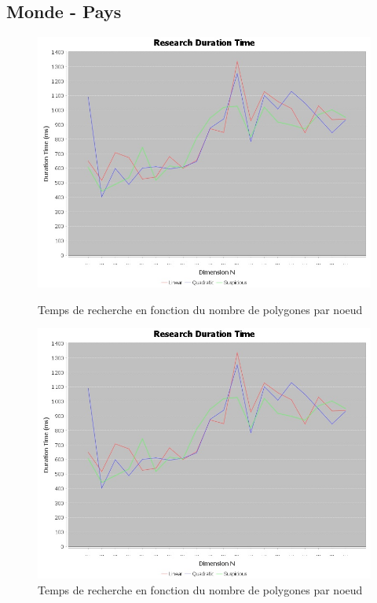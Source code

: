 \documentclass {article}
\begin{document}

\subsection {Monde - Pays}\label{mondePays}

\begin{figure}[h]
    \begin{minipage}[t]{0.46\textwidth}
	\centering
	\includegraphics[width=\textwidth]{research_graph_belgium.png}
	\caption{Temps de recherche en fonction du nombre de polygones par noeud}
	\label{fig:belgique_stat_find_lin}
    \end{minipage}
    \begin{minipage}[t]{0.46\textwidth}
	\centering
	\includegraphics[width=\textwidth]{research_graph_belgium.png}
	\caption{Temps de recherche en fonction du nombre de polygones par noeud}
	\label{fig:belgique_stat_find_quad}
    \end{minipage}
\end{figure}
\end{document}
